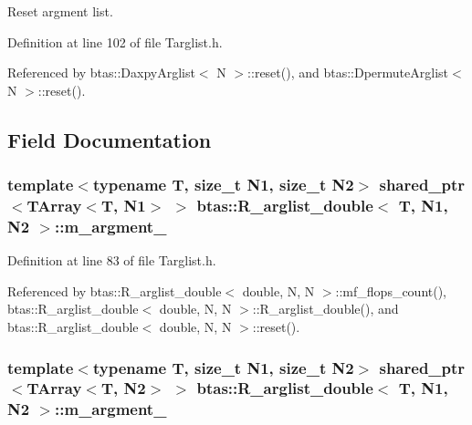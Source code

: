 Reset argment list. 



Definition at line 102 of file Targlist.\-h.



Referenced by btas\-::\-Daxpy\-Arglist$<$ N $>$\-::reset(), and btas\-::\-Dpermute\-Arglist$<$ N $>$\-::reset().



\subsection{Field Documentation}
\subsubsection[{m\-\_\-argment\-\_\-1}]{\setlength{\rightskip}{0pt plus 5cm}template$<$typename T, size\-\_\-t N1, size\-\_\-t N2$>$ shared\-\_\-ptr$<${\bf T\-Array}$<$T, N1$>$ $>$ {\bf btas\-::\-R\-\_\-arglist\-\_\-double}$<$ T, N1, N2 $>$\-::m\-\_\-argment\-\_\hspace{0.3cm}{\ttfamily [protected]}}\label{d5/dcd/classbtas_1_1R__arglist__double_aaa79f8a1486bbdd970a80758474532db}


Definition at line 83 of file Targlist.\-h.



Referenced by btas\-::\-R\-\_\-arglist\-\_\-double$<$ double, N, N $>$\-::mf\-\_\-flops\-\_\-count(), btas\-::\-R\-\_\-arglist\-\_\-double$<$ double, N, N $>$\-::\-R\-\_\-arglist\-\_\-double(), and btas\-::\-R\-\_\-arglist\-\_\-double$<$ double, N, N $>$\-::reset().

\subsubsection[{m\-\_\-argment\-\_\-2}]{\setlength{\rightskip}{0pt plus 5cm}template$<$typename T, size\-\_\-t N1, size\-\_\-t N2$>$ shared\-\_\-ptr$<${\bf T\-Array}$<$T, N2$>$ $>$ {\bf btas\-::\-R\-\_\-arglist\-\_\-double}$<$ T, N1, N2 $>$\-::m\-\_\-argment\-\_\hspace{0.3cm}{\ttfamily [protected]}}\label{d5/dcd/classbtas_1_1R__arglist__double_ad6bf3381e21b264eacded62951903004}



